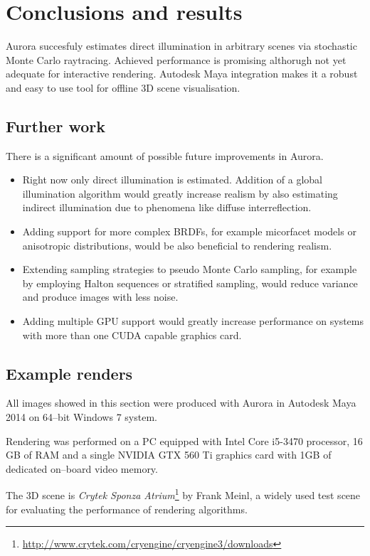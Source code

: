 \chapter{Conclusions and results}
\label{ch:results}

Aurora succesfuly estimates direct illumination in arbitrary scenes via stochastic Monte Carlo raytracing. Achieved performance is promising althorugh not yet adequate for interactive rendering. Autodesk Maya integration makes it a robust and easy to use tool for offline 3D scene visualisation.

\section{Further work}
There is a significant amount of possible future improvements in Aurora.
\begin{itemize}
\item Right now only direct illumination is estimated. Addition of a global illumination algorithm would greatly increase realism by also estimating indirect illumination due to phenomena like diffuse interreflection.
\item Adding support for more complex BRDFs, for example micorfacet models or anisotropic distributions, would be also beneficial to rendering realism.
\item Extending sampling strategies to pseudo Monte Carlo sampling, for example by employing Halton sequences or stratified sampling, would reduce variance and produce images with less noise.
\item Adding multiple GPU support would greatly increase performance on systems with more than one CUDA capable graphics card.
\end{itemize}
\vfill

\section{Example renders}
All images showed in this section were produced with Aurora in Autodesk Maya 2014 on 64--bit Windows 7 system. 

Rendering was performed on a PC equipped with Intel Core i5-3470 processor, 16 GB of RAM and a single NVIDIA GTX 560 Ti graphics card with 1GB of dedicated on--board video memory.

The 3D scene is \emph{Crytek Sponza Atrium}\footnote{\url{http://www.crytek.com/cryengine/cryengine3/downloads}} by Frank Meinl, a widely used test scene for evaluating the performance of rendering algorithms.

